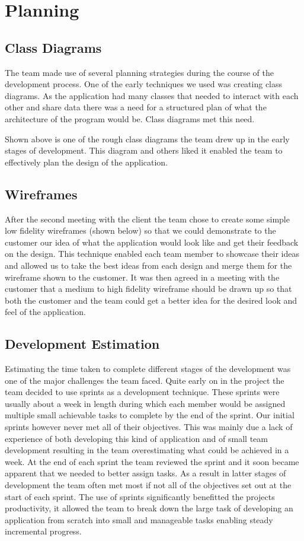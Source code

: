 \documentclass{l3proj}
\begin{document}
\section{Planning}
\label{sec:planning}

\subsection{Class Diagrams}
The team made use of several planning strategies during the course of the development process. One of the early techniques we used was creating class diagrams. As the application had many classes that needed to interact with each other and share data there was a need for a structured plan of what the architecture of the program would be. Class diagrams met this need.

Shown above is one of the rough class diagrams the team drew up in the early stages of development. This diagram and others liked it enabled the team to effectively plan the design of the application.

\subsection{Wireframes}
After the second meeting with the client the team chose to create some simple low fidelity wireframes (shown below) so that we could demonstrate to the customer our idea of what the application would look like and get their feedback on the design. This technique enabled each team member to showcase their ideas and allowed us to take the best ideas from each design and merge them for the wireframe shown to the customer. It was then agreed in a meeting with the customer that a medium to high fidelity wireframe should be drawn up so that both the customer and the team could get a better idea for the desired look and feel of the application.

\subsection{Development Estimation}
Estimating the time taken to complete different stages of the development was one of the major challenges the team faced. Quite early on in the project the team decided to use sprints as a development technique. These sprints were usually about a week in length during which each member would be assigned multiple small achievable tasks to complete by the end of the sprint. Our initial sprints however never met all of  their objectives. This was mainly due a lack of experience of  both developing this kind of application and of small team development resulting in the team overestimating what could be achieved in a week. At the end of each sprint the team reviewed the sprint and it soon became apparent that we needed to better assign tasks. As a result in latter stages of development the team often met most if not all of  the objectives set out at the start of each sprint. The use of sprints significantly benefitted the projects productivity, it allowed the team to break down the large task of developing an application from scratch into small and manageable tasks enabling steady incremental progress.
\end{document}
